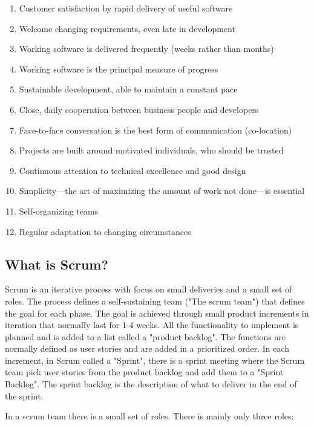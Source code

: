 \begin{enumerate}
    \item Customer satisfaction by rapid delivery of useful software
    \item Welcome changing requirements, even late in development
    \item Working software is delivered frequently (weeks rather than months)
    \item Working software is the principal measure of progress
    \item Sustainable development, able to maintain a constant pace
    \item Close, daily cooperation between business people and developers
    \item Face-to-face conversation is the best form of communication (co-location)
    \item Projects are built around motivated individuals, who should be trusted
    \item Continuous attention to technical excellence and good design
    \item Simplicity—the art of maximizing the amount of work not done—is essential
    \item Self-organizing teams
    \item Regular adaptation to changing circumstances
\end{enumerate}

\subsection*{What is Scrum?}

Scrum is an iterative process with focus on small deliveries and a small set of roles. 
The process defines a self-sustaining team ("The scrum team") that defines the goal for each phase. The goal 
is achieved through small product increments in iteration that normally last for 1-4 weeks. 
All the functionality to implement is planned and is added to a list called a "product backlog". The
functions are normally defined as user stories and are added in a prioritized order. In each increment, 
in Scrum called a "Sprint", there is a sprint meeting where the Scrum team pick user stories from the 
product backlog and add them to a "Sprint Backlog". The sprint backlog is the description of what 
to deliver in the end of the sprint. \cite{wikiScrum}

In a scrum team there is a small set of roles. There is mainly only three roles: 

